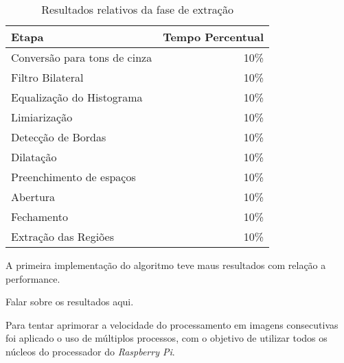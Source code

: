 \begin{table}[H]
\centering
\caption{Resultados relativos da fase de extração}
\label{tab:resultados_relativos}
\begin{tabular}{@{}lr@{}}
\toprule
Etapa                        & Tempo Percentual \\ \midrule
Conversão para tons de cinza & 10\%             \\
Filtro Bilateral             & 10\%             \\
Equalização do Histograma    & 10\%             \\
Limiarização                 & 10\%             \\
Detecção de Bordas           & 10\%             \\
Dilatação                    & 10\%             \\
Preenchimento de espaços     & 10\%             \\
Abertura                     & 10\%             \\
Fechamento                   & 10\%             \\
Extração das Regiões         & 10\%             \\ \bottomrule
\end{tabular}
\end{table}

A primeira implementação do algoritmo teve maus resultados com relação a performance. 

Falar sobre os resultados aqui. 

Para tentar aprimorar a velocidade do processamento em imagens consecutivas foi aplicado o uso de múltiplos processos, com o objetivo de utilizar todos os núcleos do processador do \emph{Raspberry Pi}.
